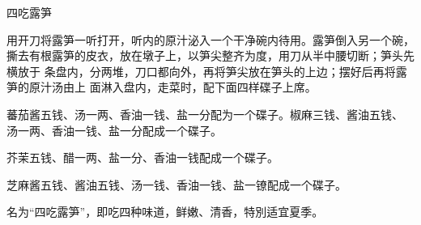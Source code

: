 \begin{recipe}{四吃露笋}

\ingredients


\preparation

\step 用开刀将露笋一听打开，听内的原汁泌入一个干净碗内待用。露笋倒入另一个碗，
撕去有根露笋的皮衣，放在墩子上，以笋尖整齐为度，用刀从半中腰切断；笋头先横放于
条盘内，分两堆，刀口都向外，再将笋尖放在笋头的上边；摆好后再将露笋的原汁汤由上
面淋入盘内，走菜时，配下面四样碟子上席。

\step 蕃茄酱五钱、汤一两、香油一钱、盐一分配为一个碟子。椒麻三钱、酱油五钱、
汤一两、香油一钱、盐一分配成一个碟子。

\step 芥茉五钱、醋一两、盐一分、香油一钱配成一个碟子。

\step 芝麻酱五钱、酱油五钱、汤一钱、香油一钱、盐一镣配成一个碟子。

\features

名为“四吃露笋”，即吃四种味道，鲜嫩、清香，特別适宜夏季。

\end{recipe}


